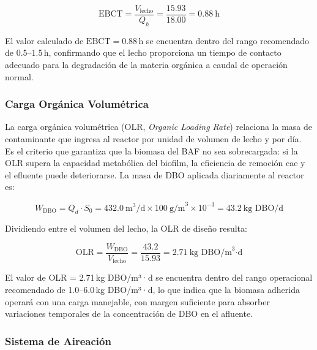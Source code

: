 \begin{equation}
\text{EBCT} = \frac{V_{\text{lecho}}}{Q_{h}} = \frac{15.93}{18.00} = 0.88\ \text{h}
\end{equation}

El valor calculado de $\text{EBCT} = 0.88$\,h se encuentra dentro del rango recomendado de 0.5--1.5\,h, confirmando que el lecho proporciona un tiempo de contacto adecuado para la degradación de la materia orgánica a caudal de operación normal.

\subsubsection*{Carga Orgánica Volumétrica}

La carga orgánica volumétrica (OLR, \textit{Organic Loading Rate}) relaciona la masa de contaminante que ingresa al reactor por unidad de volumen de lecho y por día. Es el criterio que garantiza que la biomasa del BAF no sea sobrecargada: si la OLR supera la capacidad metabólica del biofilm, la eficiencia de remoción cae y el efluente puede deteriorarse. La masa de DBO aplicada diariamente al reactor es:

\begin{equation}
W_{\text{DBO}} = Q_{d} \cdot S_0 = 432.0\ \text{m}^3\text{/d} \times 100\ \text{g/m}^3 \times 10^{-3} = 43.2\ \text{kg DBO/d}
\end{equation}

Dividiendo entre el volumen del lecho, la OLR de diseño resulta:

\begin{equation}
\text{OLR} = \frac{W_{\text{DBO}}}{V_{\text{lecho}}} = \frac{43.2}{15.93} = 2.71\ \text{kg DBO/m}^3\text{·d}
\end{equation}

El valor de OLR = 2.71\,kg DBO/m³·d se encuentra dentro del rango operacional recomendado de 1.0--6.0\,kg DBO/m³·d, lo que indica que la biomasa adherida operará con una carga manejable, con margen suficiente para absorber variaciones temporales de la concentración de DBO en el afluente.

\subsubsection*{Sistema de Aireación}

